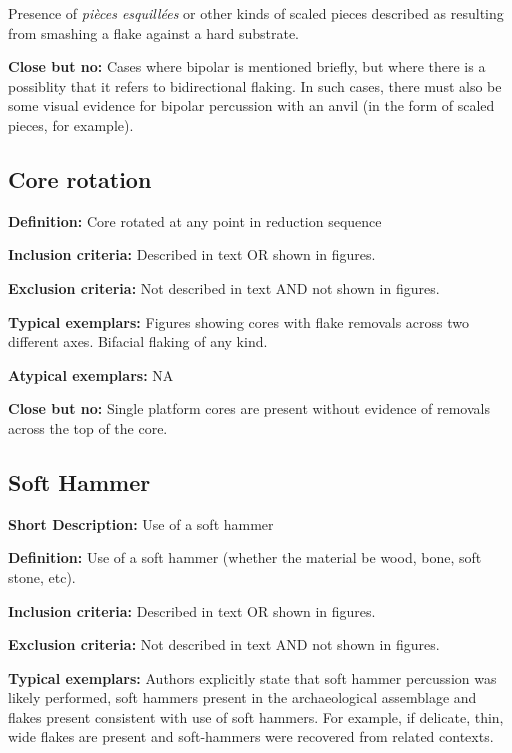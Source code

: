 \documentclass[
]{article}
\begin{document}
Presence of \emph{pièces esquillées} or other kinds of scaled pieces
described as resulting from smashing a flake against a hard substrate.

\textbf{Close but no:} Cases where bipolar is mentioned briefly, but
where there is a possiblity that it refers to bidirectional flaking. In
such cases, there must also be some visual evidence for bipolar
percussion with an anvil (in the form of scaled pieces, for example).

\hypertarget{core-rotation}{%
\subsection{Core rotation}\label{core-rotation}}

\textbf{Definition:} Core rotated at any point in reduction sequence

\textbf{Inclusion criteria:} Described in text OR shown in figures.

\textbf{Exclusion criteria:} Not described in text AND not shown in
figures.

\textbf{Typical exemplars:} Figures showing cores with flake removals
across two different axes. Bifacial flaking of any kind.

\textbf{Atypical exemplars:} NA

\textbf{Close but no:} Single platform cores are present without
evidence of removals across the top of the core.

\hypertarget{soft-hammer}{%
\subsection{Soft Hammer}\label{soft-hammer}}

\textbf{Short Description:} Use of a soft hammer

\textbf{Definition:} Use of a soft hammer (whether the material be wood,
bone, soft stone, etc).

\textbf{Inclusion criteria:} Described in text OR shown in figures.

\textbf{Exclusion criteria:} Not described in text AND not shown in
figures.

\textbf{Typical exemplars:} Authors explicitly state that soft hammer
percussion was likely performed, soft hammers present in the
archaeological assemblage and flakes present consistent with use of soft
hammers. For example, if delicate, thin, wide flakes are present and
soft-hammers were recovered from related contexts.
\end{document}
